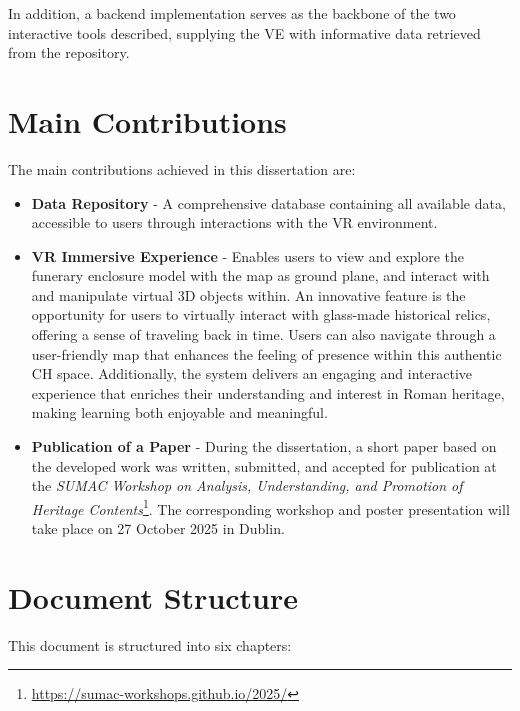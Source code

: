 In addition, a backend implementation serves as the backbone of the two interactive tools described, supplying the \gls{VE} with informative data retrieved from the repository.

\section{Main Contributions}
\label{sec:contributions}

The main contributions achieved in this dissertation are:

\begin{itemize}
   \item  \textbf{Data Repository} - A comprehensive database containing all available data, accessible to users through interactions with the \gls{VR} environment.
   \item \textbf{\gls{VR} Immersive Experience} - Enables users to view and explore the funerary enclosure model with the map as ground plane, and interact with and manipulate virtual \gls{3D} objects within.  An innovative feature is the opportunity for users to virtually interact with glass-made historical relics, offering a sense of traveling back in time. Users can also navigate through a user-friendly map that enhances the feeling of presence within this authentic \gls{CH} space. 
   Additionally, the system delivers an engaging and interactive experience that enriches their understanding and interest in Roman heritage, making learning both enjoyable and meaningful.
   \item \textbf{Publication of a Paper} - During the dissertation, a short paper based on the developed work was written, submitted, and accepted for publication at the \textit{SUMAC Workshop on Analysis, Understanding, and Promotion of Heritage Contents}\footnote{\url{https://sumac-workshops.github.io/2025/}}. The corresponding workshop and poster presentation will take place on 27 October 2025 in Dublin.
\end{itemize}


\section{Document Structure}
\label{sec:document_structure}

This document is structured into six chapters:

